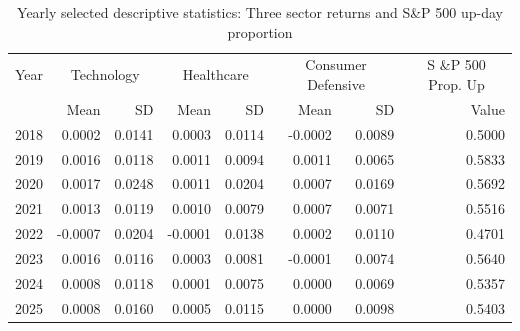 \begin{table}[htbp]
\centering
\begin{tabular}{lrr|rr|rr|r}
\hline
Year & \multicolumn{2}{c|}{Technology} & \multicolumn{2}{c|}{Healthcare} & \multicolumn{2}{c|}{Consumer Defensive} & \multicolumn{1}{c}{S \&P 500 Prop. Up} \\
 & Mean & SD & Mean & SD & Mean & SD & Value \\
\hline
2018 & 0.0002 & 0.0141 & 0.0003 & 0.0114 & -0.0002 & 0.0089 & 0.5000 \\
2019 & 0.0016 & 0.0118 & 0.0011 & 0.0094 & 0.0011 & 0.0065 & 0.5833 \\
2020 & 0.0017 & 0.0248 & 0.0011 & 0.0204 & 0.0007 & 0.0169 & 0.5692 \\
2021 & 0.0013 & 0.0119 & 0.0010 & 0.0079 & 0.0007 & 0.0071 & 0.5516 \\
2022 & -0.0007 & 0.0204 & -0.0001 & 0.0138 & 0.0002 & 0.0110 & 0.4701 \\
2023 & 0.0016 & 0.0116 & 0.0003 & 0.0081 & -0.0001 & 0.0074 & 0.5640 \\
2024 & 0.0008 & 0.0118 & 0.0001 & 0.0075 & 0.0000 & 0.0069 & 0.5357 \\
2025 & 0.0008 & 0.0160 & 0.0005 & 0.0115 & 0.0000 & 0.0098 & 0.5403 \\
\hline
\end{tabular}
\caption{Yearly selected descriptive statistics: Three sector returns and S\&P 500 up-day proportion}
\label{tab:descriptive_stats}
\end{table}

